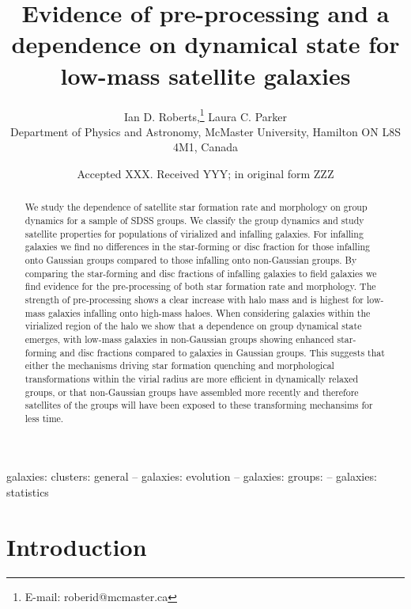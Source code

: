 \documentclass[a4paper,fleqn,usenatbib]{mnras}
\title[Pre-processing \& dynamical dependence]{Evidence of
  pre-processing and a dependence on dynamical state for low-mass
  satellite galaxies}
\author[I.D. Roberts \& L.C. Parker]{
Ian D. Roberts,\thanks{E-mail: roberid@mcmaster.ca}
Laura C. Parker
\\
Department of Physics and Astronomy, McMaster University, Hamilton ON
L8S 4M1, Canada
}
\date{Accepted XXX. Received YYY; in original form ZZZ}
\begin{document}
\label{firstpage}
\pagerange{\pageref{firstpage}--\pageref{lastpage}}
\maketitle

\begin{abstract}
We study the dependence of satellite star formation rate and
morphology on group dynamics for a sample of SDSS groups.  We classify
the group dynamics and study satellite properties for populations of
virialized and infalling galaxies.  For infalling galaxies
we find no differences in the star-forming or
disc fraction for those infalling onto Gaussian groups compared to
those infalling onto non-Gaussian groups.  By comparing the
star-forming and disc fractions of infalling galaxies to field
galaxies we find evidence for the pre-processing of both star
formation rate and morphology.  The strength of pre-processing shows a
clear increase with halo mass and is highest for low-mass galaxies
infalling onto high-mass haloes.  When considering galaxies within the
virialized region of the halo we show that a dependence on group
dynamical state emerges, with low-mass galaxies in non-Gaussian groups showing
enhanced star-forming and disc fractions compared to galaxies in
Gaussian groups.  This suggests that either the
mechanisms driving star formation quenching and morphological
transformations within the virial radius are more efficient in
dynamically relaxed groups, or that non-Gaussian groups have assembled more
recently and therefore satellites of the groups will have been exposed
to these transforming mechansims for less time.
\end{abstract}

\begin{keywords}
galaxies: clusters: general -- galaxies: evolution -- galaxies:
groups: -- galaxies: statistics
\end{keywords}



\section{Introduction}
\label{sec:introduction}
\end{document}
